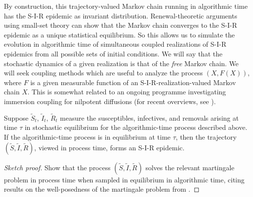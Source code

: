 \documentclass[]{article}
\newcommand{\SIR}{S-I-R\xspace}
\begin{document}
By construction, this trajectory-valued Markov chain running in algorithmic time has the \SIR epidemic as invariant distribution.
Renewal-theoretic arguments using small-set theory can show that the Markov chain converges to the \SIR epidemic as a unique statistical equilibrium.%
So this allows us to simulate the evolution in algorithmic time of simultaneous coupled realizations of \SIR epidemics from all possible sets of initial conditions.
 We will say that the stochastic dynamics of a given realization is that of the \emph{free} Markov chain.
  We will seek coupling methods which are useful to analyze the process \((X, F(X))\), 
where \(F\) is a given measurable function of an \SIR-realization-valued Markov chain \(X\). 
This is somewhat related to an ongoing programme investigating immersion coupling for nilpotent diffusions (for recent overviews, see \citealp{Kendall-2009d,Kendall-2013a}).
 

 \begin{thm}\label{thm:SIR-epidemic-1}
 Suppose \(\widetilde{S}_t\), \(\widetilde{I}_t\), \(\widetilde{R}_t\) measure the susceptibles, infectives, and removals 
 arising at time \(\tau\) in stochastic equilibrium for the algorithmic-time process described above.
 If the algorithmic-time process is in equilibrium at time \(\tau\), then the trajectory \((\widetilde{S}, \widetilde{I}, \widetilde{R})\), viewed in process time, forms an \SIR epidemic.
\end{thm}
\begin{proof}[Sketch proof]
 Show that the process \((\widetilde{S}, \widetilde{I}, \widetilde{R})\) solves the relevant martingale problem in process time when sampled in equilibrium in algorithmic time,  
 citing results on the well-posedness of the martingale problem from \citet{StroockVaradhan-1979}.%
\end{proof}


 
\end{document}
